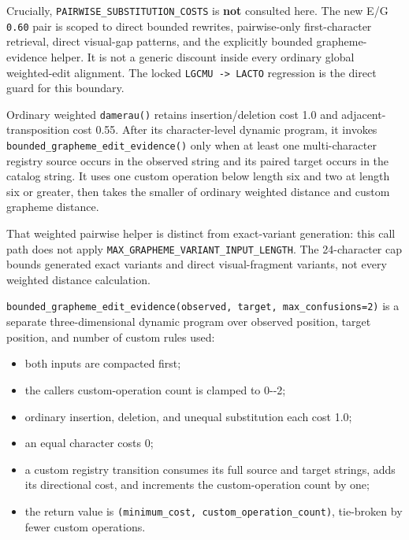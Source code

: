 Crucially, \texttt{PAIRWISE\_\allowbreak{}SUBSTITUTION\_\allowbreak{}COSTS} is \textbf{not} consulted here. The new E/G \texttt{0.60} pair is scoped to direct bounded rewrites, pairwise-only first-character retrieval, direct visual-gap patterns, and the explicitly bounded grapheme-evidence helper. It is not a generic discount inside every ordinary global weighted-edit alignment. The locked \texttt{LGCMU\ -\textgreater{}\ LACTO} regression is the direct guard for this boundary.

Ordinary weighted \texttt{damerau()} retains insertion/deletion cost 1.0 and adjacent-transposition cost 0.55. After its character-level dynamic program, it invokes \texttt{bounded\_\allowbreak{}grapheme\_\allowbreak{}edit\_\allowbreak{}evidence()} only when at least one multi-character registry source occurs in the observed string and its paired target occurs in the catalog string. It uses one custom operation below length six and two at length six or greater, then takes the smaller of ordinary weighted distance and custom grapheme distance.

That weighted pairwise helper is distinct from exact-variant generation: this call path does not apply \texttt{MAX\_\allowbreak{}GRAPHEME\_\allowbreak{}VARIANT\_\allowbreak{}INPUT\_\allowbreak{}LENGTH}. The 24-character cap bounds generated exact variants and direct visual-fragment variants, not every weighted distance calculation.

\texttt{bounded\_\allowbreak{}grapheme\_\allowbreak{}edit\_\allowbreak{}evidence(observed,\ target,\ max\_\allowbreak{}confusions=2)} is a separate three-dimensional dynamic program over observed position, target position, and number of custom rules used:

\begin{itemize}
\tightlist
\item
  both inputs are compacted first;
\item
  the caller\textquotesingle s custom-operation count is clamped to 0-\/-2;
\item
  ordinary insertion, deletion, and unequal substitution each cost 1.0;
\item
  an equal character costs 0;
\item
  a custom registry transition consumes its full source and target strings, adds its directional cost, and increments the custom-operation count by one;
\item
  the return value is \texttt{(minimum\_\allowbreak{}cost,\ custom\_\allowbreak{}operation\_\allowbreak{}count)}, tie-broken by fewer custom operations.
\end{itemize}

